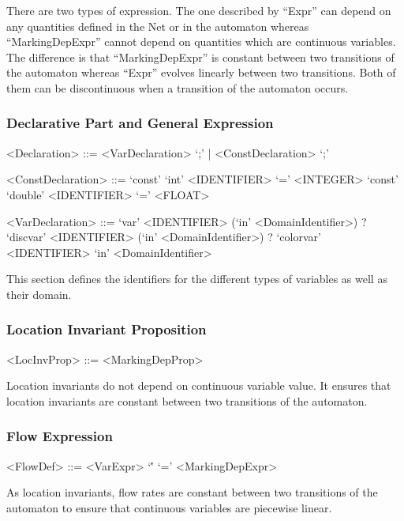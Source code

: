 \documentclass{article}
\begin{document}
There are two types of expression. The one described
by ``Expr'' can depend on any quantities defined in the Net or in the
automaton whereas ``MarkingDepExpr'' cannot depend on quantities
which are continuous variables. The difference is that
``MarkingDepExpr'' is constant between two transitions of the
automaton whereas ``Expr'' evolves linearly between two
transitions. Both of them can be discontinuous when a transition of the
automaton occurs.


\subsubsection{Declarative Part and General Expression}

\begin{scriptsize}
\begin{grammar}
  <Declaration> ::= <VarDeclaration> `;' | <ConstDeclaration> `;'

  <ConstDeclaration> ::= 
  `const' `int' <IDENTIFIER> `=' <INTEGER>
  \alt `const' `double' <IDENTIFIER> `=' <FLOAT>

  <VarDeclaration> ::= 
   `var' <IDENTIFIER> (`in' <DomainIdentifier>) ?
   \alt `discvar' <IDENTIFIER> (`in' <DomainIdentifier>) ?
   \alt `colorvar' <IDENTIFIER> `in' <DomainIdentifier>
\end{grammar}
\end{scriptsize}

This section defines the identifiers for the different types of variables
as well as their domain.

\subsubsection{Location Invariant Proposition}

\begin{scriptsize}
\begin{grammar}
  <LocInvProp> ::= <MarkingDepProp>
\end{grammar}
\end{scriptsize}

Location invariants do not depend on continuous variable value.
It ensures that location invariants are constant between two transitions
of the automaton.

\subsubsection{Flow Expression}

\begin{scriptsize}
\begin{grammar}
  <FlowDef> ::= <VarExpr> `\'' `=' <MarkingDepExpr> 
\end{grammar}
\end{scriptsize}
As location invariants, flow rates are constant between two transitions
of the automaton to ensure that continuous variables are piecewise
linear.
\end{document}
